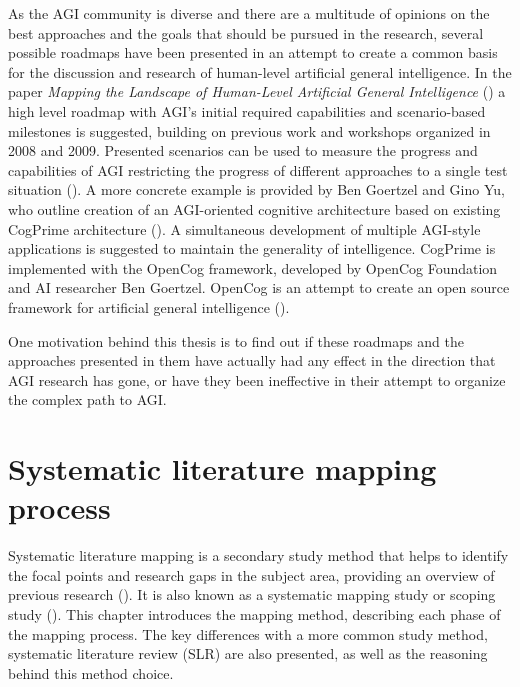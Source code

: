 As the AGI community is diverse and there are a multitude of opinions on the
best approaches and the goals that should be pursued in the research, several
possible roadmaps have been presented in an attempt to create a common basis for
the discussion and research of human-level artificial general intelligence. In
the paper \emph{Mapping the Landscape of Human-Level Artificial General
Intelligence} (\cite{adams2012}) a high level roadmap with AGI's initial
required capabilities and scenario-based milestones is suggested, building on
previous work and workshops organized in 2008 and 2009. Presented scenarios can
be used to measure the progress and capabilities of AGI restricting the progress
of different approaches to a single test situation (\cite{adams2012}). A more
concrete example is provided by Ben Goertzel and Gino Yu, who outline creation
of an AGI-oriented cognitive architecture based on existing CogPrime
architecture (\cite{goertzel2014map}). A simultaneous development of multiple
AGI-style applications is suggested to maintain the generality of intelligence.
CogPrime is implemented with the OpenCog framework, developed by OpenCog
Foundation and AI researcher Ben Goertzel. OpenCog is an attempt to create an
open source framework for artificial general intelligence
(\cite{opencogwiki,goertzel2012cog}).

One motivation behind this thesis is to find out if these roadmaps and the
approaches presented in them have actually had any effect in the direction that
AGI research has gone, or have they been ineffective in their attempt to
organize the complex path to AGI.


\chapter{Systematic literature mapping process}

\label{chap:method}

Systematic literature mapping is a secondary study method that helps to identify
the focal points and research gaps in the subject area, providing an overview of
previous research (\cite{petersen2008}). It is also known as a systematic
mapping study or scoping study (\cite{kitchenham2007}). This chapter introduces
the mapping method, describing each phase of the mapping process. The key
differences with a more common study method, systematic literature review (SLR)
are also presented, as well as the reasoning behind this method choice.

